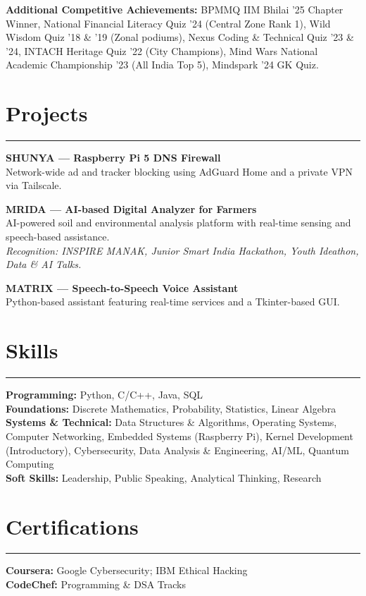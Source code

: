 \documentclass[11pt,a4paper]{article}
\newcommand{\resumesection}[1]{
  \section*{#1}
  \vspace{-4pt}
  \hrule
  \vspace{5pt}
}
\begin{document}
{\small
\textbf{Additional Competitive Achievements:}
BPMMQ IIM Bhilai '25 Chapter  Winner, National Financial Literacy Quiz '24 (Central Zone Rank 1), Wild Wisdom Quiz '18 \& '19 (Zonal podiums), Nexus Coding \& Technical Quiz '23 \& '24, INTACH Heritage Quiz '22 (City Champions), Mind Wars National Academic Championship '23 (All India Top 5), Mindspark '24 GK Quiz.
}

\resumesection{Projects}

\begin{tcolorbox}[resumebox]
\textbf{SHUNYA — Raspberry Pi 5 DNS Firewall}\\
Network-wide ad and tracker blocking using AdGuard Home and a private VPN via Tailscale.
\end{tcolorbox}

\begin{tcolorbox}[resumebox]
\textbf{MRIDA — AI-based Digital Analyzer for Farmers}\\
AI-powered soil and environmental analysis platform with real-time sensing and speech-based assistance.\\
\emph{Recognition: INSPIRE MANAK, Junior Smart India Hackathon, Youth Ideathon, Data \& AI Talks.}
\end{tcolorbox}

\begin{tcolorbox}[resumebox]
\textbf{MATRIX — Speech-to-Speech Voice Assistant}\\
Python-based assistant featuring real-time services and a Tkinter-based GUI.
\end{tcolorbox}

\resumesection{Skills}
\textbf{Programming:} Python, C/C++, Java, SQL\\
\textbf{Foundations:} Discrete Mathematics, Probability, Statistics, Linear Algebra\\
\textbf{Systems \& Technical:} Data Structures \& Algorithms, Operating Systems, Computer Networking, Embedded Systems (Raspberry Pi), Kernel Development (Introductory), Cybersecurity, Data Analysis \& Engineering, AI/ML, Quantum Computing\\
\textbf{Soft Skills:} Leadership, Public Speaking, Analytical Thinking, Research


\resumesection{Certifications}
\textbf{Coursera:} Google Cybersecurity; IBM Ethical Hacking\\
\textbf{CodeChef:} Programming \& DSA Tracks
\end{document}

